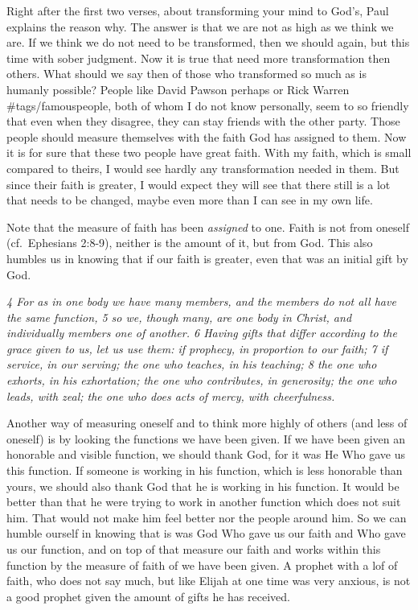 Right after the first two verses, about transforming your mind to God's,
Paul explains the reason why. The answer is that we are not as high as
we think we are. If we think we do not need to be transformed, then we
should again, but this time with sober judgment. Now it is true that
need more transformation then others. What should we say then of those
who transformed so much as is humanly possible? People like David Pawson
perhaps or Rick Warren \#tags/famouspeople, both of whom I do not know
personally, seem to so friendly that even when they disagree, they can
stay friends with the other party. Those people should measure
themselves with the faith God has assigned to them. Now it is for sure
that these two people have great faith. With my faith, which is small
compared to theirs, I would see hardly any transformation needed in
them. But since their faith is greater, I would expect they will see
that there still is a lot that needs to be changed, maybe even more than
I can see in my own life.

Note that the measure of faith has been \emph{assigned} to one. Faith is
not from oneself (cf.~Ephesians 2:8-9), neither is the amount of it, but
from God. This also humbles us in knowing that if our faith is greater,
even that was an initial gift by God.

\emph{4 For as in one body we have many members, and the members do not
all have the same function, 5 so we, though many, are one body in
Christ, and individually members one of another. 6 Having gifts that
differ according to the grace given to us, let us use them: if prophecy,
in proportion to our faith; 7 if service, in our serving; the one who
teaches, in his teaching; 8 the one who exhorts, in his exhortation; the
one who contributes, in generosity; the one who leads, with zeal; the
one who does acts of mercy, with cheerfulness.}

Another way of measuring oneself and to think more highly of others (and
less of oneself) is by looking the functions we have been given. If we
have been given an honorable and visible function, we should thank God,
for it was He Who gave us this function. If someone is working in his
function, which is less honorable than yours, we should also thank God
that he is working in his function. It would be better than that he were
trying to work in another function which does not suit him. That would
not make him feel better nor the people around him. So we can humble
ourself in knowing that is was God Who gave us our faith and Who gave us
our function, and on top of that measure our faith and works within this
function by the measure of faith of we have been given. A prophet with a
lof of faith, who does not say much, but like Elijah at one time was
very anxious, is not a good prophet given the amount of gifts he has
received.

